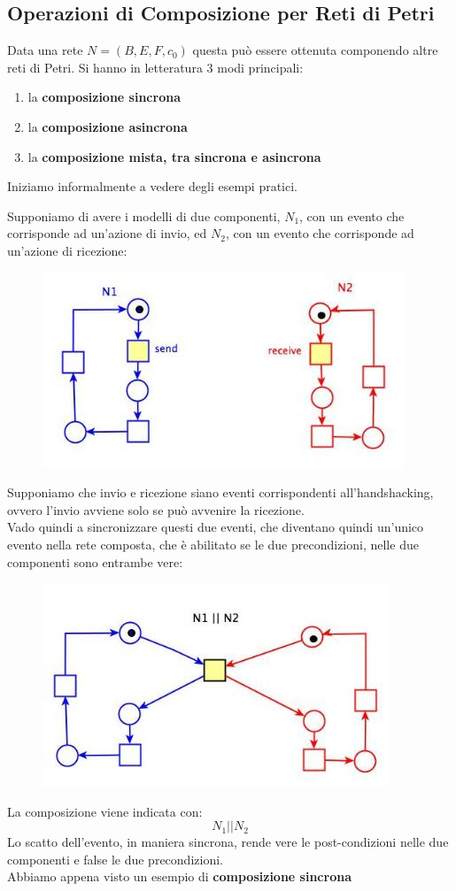\subsection{Operazioni di Composizione per Reti di Petri}
Data una rete $N=(B, E, F, c_0)$ questa può essere ottenuta componendo altre reti
di Petri. Si hanno in letteratura 3 modi principali:
\begin{enumerate}
  \item la \textbf{composizione sincrona}
  \item la \textbf{composizione asincrona}
  \item la \textbf{composizione mista, tra sincrona e asincrona}
\end{enumerate}
\newpage
Iniziamo informalmente a vedere degli esempi pratici.
\begin{esempio}
  Supponiamo di avere i modelli di due componenti, $N_1$, con un evento che
  corrisponde ad un'azione di invio, ed $N_2$, con un evento che corrisponde ad
  un'azione di ricezione:
  \begin{figure}[H]
    \centering
    \includegraphics[scale = 0.5]{img/sinc.jpg} 
  \end{figure}
  Supponiamo che invio e ricezione siano eventi corrispondenti all'handshacking,
  ovvero l'invio avviene solo se può avvenire la ricezione.\\
  Vado quindi a sincronizzare questi due eventi, che diventano quindi un'unico
  evento nella rete composta, che è abilitato se le due precondizioni, nelle due
  componenti sono entrambe vere: 
  \begin{figure}[H]
    \centering
    \includegraphics[scale = 0.5]{img/sinc2.jpg} 
  \end{figure}
  La composizione viene indicata con:
  \[N_1||N_2\]
  Lo scatto dell'evento, in maniera sincrona, rende vere le post-condizioni nelle
  due componenti e false le due precondizioni.\\
  Abbiamo appena visto un esempio di \textbf{composizione sincrona}
\end{esempio}
